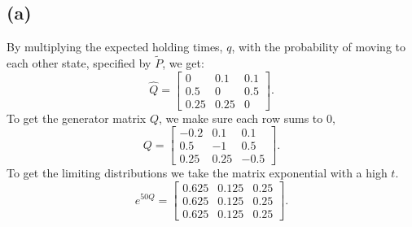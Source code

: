 \documentclass{article}
\begin{document}
\subsection{(a)}
By multiplying the expected holding times, $q$,
with the probability of moving to each other state,
specified by $\tilde P$, we get:
$$ \hat{Q} = \begin{bmatrix}
0 & 0.1 & 0.1\\
0.5 & 0 & 0.5\\
0.25 & 0.25 & 0
\end{bmatrix}.$$
To get the generator matrix $Q$, we make sure each row sums to 0,
$$ Q = \begin{bmatrix}
-0.2 & 0.1 & 0.1\\
0.5 & -1 & 0.5\\
0.25 & 0.25 & -0.5
\end{bmatrix}.$$
To get the limiting distributions we take the matrix exponential with a high $t$.
$$ e^{50Q} = \begin{bmatrix}
0.625 & 0.125 & 0.25\\
0.625 & 0.125 & 0.25\\
0.625 & 0.125 & 0.25
\end{bmatrix}.$$
\end{document}
